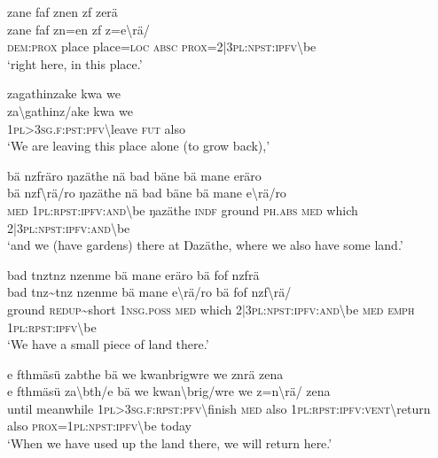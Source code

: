 \ea\label{ex:2:a1683}
zane faf znen zf zerä\\
\gll zane	faf	zn=en	zf	z=e{\textbackslash}rä/\\
     \textsc{dem}:\textsc{prox}	place	place=\textsc{loc}	\textsc{absc}	\textsc{prox}=2|3\textsc{pl}:\textsc{npst}:\textsc{ipfv}{\textbackslash}be\\
\glt `right here, in this place.'
\z

\ea\label{ex:2:a1684}
zagathinzake kwa we\\
\gll za{\textbackslash}gathinz/ake	kwa	we\\
     1\textsc{pl}>3\textsc{sg}.\textsc{f}:\textsc{pst}:\textsc{pfv}{\textbackslash}leave	\textsc{fut}	also\\
\glt `We are leaving this place alone (to grow back),'
\z

\ea\label{ex:2:a1685}
bä nzfräro ŋazäthe nä bad bäne bä mane eräro\\
\gll bä	nzf{\textbackslash}rä/ro	ŋazäthe	nä	bad	bäne	bä	mane	e{\textbackslash}rä/ro\\
     \textsc{med}	1\textsc{pl}:\textsc{rpst}:\textsc{ipfv}:\textsc{and}{\textbackslash}be	ŋazäthe	\textsc{indf}	ground	\textsc{ph}.\textsc{abs}	\textsc{med}	which	2|3\textsc{pl}:\textsc{npst}:\textsc{ipfv}:\textsc{and}{\textbackslash}be\\
\glt `and we (have gardens) there at Ŋazäthe, where we also have some land.'
\z

\ea\label{ex:2:a1686}
bad tnztnz nzenme bä mane eräro bä fof nzfrä\\
\gll bad	tnz{\textasciitilde}tnz	nzenme	bä	mane	e{\textbackslash}rä/ro	bä	fof	nzf{\textbackslash}rä/\\
     ground	\textsc{redup}{\textasciitilde}short	1\textsc{nsg}.\textsc{poss}	\textsc{med}	which	2|3\textsc{pl}:\textsc{npst}:\textsc{ipfv}:\textsc{and}{\textbackslash}be	\textsc{med}	\textsc{emph}	1\textsc{pl}:\textsc{rpst}:\textsc{ipfv}{\textbackslash}be\\
\glt `We have a small piece of land there.'
\z

\ea\label{ex:2:a1687}
e fthmäsü zabthe bä we kwanbrigwre we znrä zena\\
\gll e	fthmäsü	za{\textbackslash}bth/e	bä	we	kwan{\textbackslash}brig/wre	we	z=n{\textbackslash}rä/	zena\\
     until	meanwhile	1\textsc{pl}>3\textsc{sg}.\textsc{f}:\textsc{rpst}:\textsc{pfv}{\textbackslash}finish	\textsc{med}	also	1\textsc{pl}:\textsc{rpst}:\textsc{ipfv}:\textsc{vent}{\textbackslash}return	also	\textsc{prox}=1\textsc{pl}:\textsc{npst}:\textsc{ipfv}{\textbackslash}be	today\\
\glt `When we have used up the land there, we will return here.'
\z

